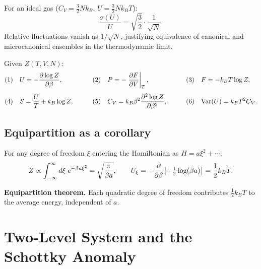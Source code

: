 \begin{example}
For an ideal gas ($C_V = \tfrac{3}{2}Nk_B$, $U = \tfrac{3}{2}Nk_BT$):
\begin{equation}
    \frac{\sigma(U)}{U} = \sqrt{\frac{3}{2}}\cdot\frac{1}{\sqrt{N}}.
\end{equation}
Relative fluctuations vanish as $1/\sqrt{N}$, justifying equivalence of canonical and microcanonical ensembles in the thermodynamic limit.
\end{example}

\begin{theorem}
Given $Z(T, V, N)$:
\begin{alignat}{3}
    &\text{(1)}\quad U = -\pdv{\log Z}{\beta}, \qquad
    &&\text{(2)}\quad P = -\left.\pdv{F}{V}\right|_T, \qquad
    &&\text{(3)}\quad F = -k_B T \log Z,\\[4pt]
    &\text{(4)}\quad S = \frac{U}{T} + k_B \log Z, \qquad
    &&\text{(5)}\quad C_V = k_B\beta^2\pdv[2]{\log Z}{\beta}, \qquad
    &&\text{(6)}\quad \mathrm{Var}(U) = k_B T^2 C_V.
\end{alignat}
\end{theorem}

\subsection*{Equipartition as a corollary}

For any degree of freedom $\xi$ entering the Hamiltonian as $H = a\xi^2 + \cdots$:
\begin{equation}
    Z \propto \int_{-\infty}^{\infty} d\xi\;e^{-\beta a\xi^2} = \sqrt{\frac{\pi}{\beta a}},
    \qquad
    U_\xi = -\pdv{}{\beta}\!\left[-\tfrac{1}{2}\log(\beta a)\right] = \frac{1}{2}k_BT.
\end{equation}

\begin{fact}
\textbf{Equipartition theorem.} Each quadratic degree of freedom contributes $\tfrac{1}{2}k_BT$ to the average energy, independent of $a$.
\end{fact}

\section{Two-Level System and the Schottky Anomaly}

